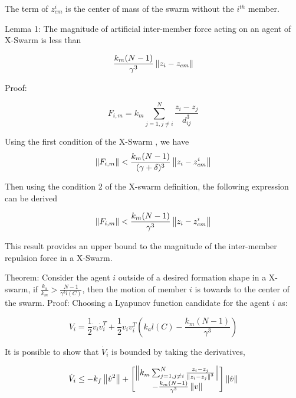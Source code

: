 The term of $z_{cm}^i$ is the center of mass of the swarm without the $i^{th}$ member.

Lemma 1: The magnitude of artificial inter-member force acting on an agent of X-Swarm  is less than

\begin{equation}
\frac{k_m(N-1)}{\gamma ^3} \left\lVert z_i - z_{cm}\right\rVert
\end{equation}

Proof:

\begin{equation}
F_{i,m} = k_m \sum_{j=1, j \neq i}^{N} \frac{z_i - z_j}{d_{ij}^3} 
\end{equation}

Using the first condition of the X-Swarm , we have
\begin{equation}
\left\lVert F_{i,m}\right\rVert < \frac{k_m(N-1)}{(\gamma + \delta)^3} \left\lVert z_i - z_{cm}^i\right\rVert
\end{equation}

Then using the condition 2 of the X-swarm definition, the following expression can be derived

\begin{equation}
\left\lVert F_{i,m}\right\rVert < \frac{k_m(N-1)}{\gamma^3} \left\lVert z_i - z_{cm}^i\right\rVert
\end{equation}

This result provides an upper bound to the magnitude of the inter-member repulsion force in a X-Swarm.  
		
Theorem: Consider the agent $i$	outside of a desired formation shape in a X-swarm, if $\frac{k_a}{k_m} > \frac{N-1}{\gamma^3  l(C)}$, then the motion of member $i$ is towards to the center of the swarm. \newline
Proof: Choosing a Lyapunov function candidate for the agent $i$ as:

\begin{equation}
V_i = \frac{1}{2} \dot{v}_i \dot{v}_i^T + \frac{1}{2} v_i v_i^T\left(k_al(C)-\frac{k_m(N-1)}{\gamma^3}\right) 
\end{equation}

It is possible to show that $\dot{V}_i$ is bounded by taking the derivatives,
			
\begin{equation}
\dot{V}_i \leq -k_f \left\lVert\dot{v}^2\right\rVert + \begin{bmatrix}
\left\lVert k_m \sum_{j=1, j \neq i}^{N} \frac{z_i - z_j}{\left\lVert z_i - z_j\right\rVert^3}\right\rVert \\
- \frac{k_m(N-1)}{\gamma ^3} \left\lVert v\right\rVert
\end{bmatrix} \left\lVert\dot{v}\right\rVert
\end{equation}
			
